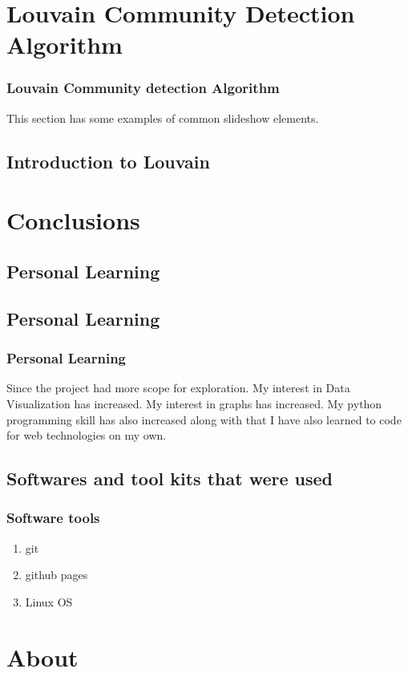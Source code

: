 \documentclass{beamer}
\begin{document}
\section{Louvain Community Detection Algorithm}

\frame
{
	\frametitle{Louvain Community detection Algorithm}

	This section has some examples of common slideshow elements.
}

\subsection{Introduction to Louvain}

\frame
{
	
}




\section{Conclusions}
\subsection{Personal Learning}


\subsection{Personal Learning}

\frame
{
	\frametitle{Personal Learning}
Since the project had more scope for exploration.
My interest in Data Visualization has increased.
My interest in graphs has increased.
My python programming skill has also increased along with that I have also learned to code for web technologies on my own.
}

\subsection{Softwares and tool kits that were used}

\frame
{
	\frametitle{Software tools}
	\begin{enumerate}
		\item git
		\item github pages
		\item Linux OS
	\end{enumerate}
}


\section{About}
\end{document}
